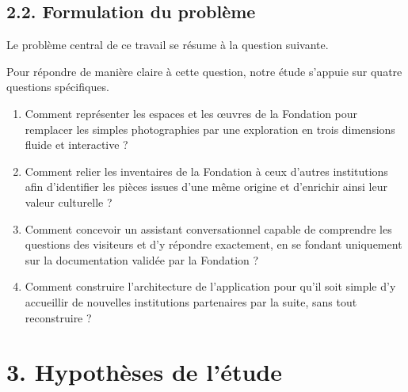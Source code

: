 \subsection*{2.2. Formulation du problème}

Le problème central de ce travail se résume à la question suivante.


Pour répondre de manière claire à cette question, notre étude s'appuie sur
quatre questions spécifiques.

\begin{enumerate}
  \item[\textbf{QS1.}] Comment représenter les espaces et les œuvres de la
        Fondation pour remplacer les simples photographies par une exploration
        en trois dimensions fluide et interactive ?

  \item[\textbf{QS2.}] Comment relier les inventaires de la Fondation à ceux
        d'autres institutions afin d'identifier les pièces issues d'une même
        origine et d'enrichir ainsi leur valeur culturelle ?

  \item[\textbf{QS3.}] Comment concevoir un assistant conversationnel capable de
        comprendre les questions des visiteurs et d'y répondre exactement, en se
        fondant uniquement sur la documentation validée par la Fondation ?

  \item[\textbf{QS4.}] Comment construire l'architecture de l'application pour
        qu'il soit simple d'y accueillir de nouvelles institutions partenaires
        par la suite, sans tout reconstruire ?
\end{enumerate}

\section*{3. Hypothèses de l'étude}

